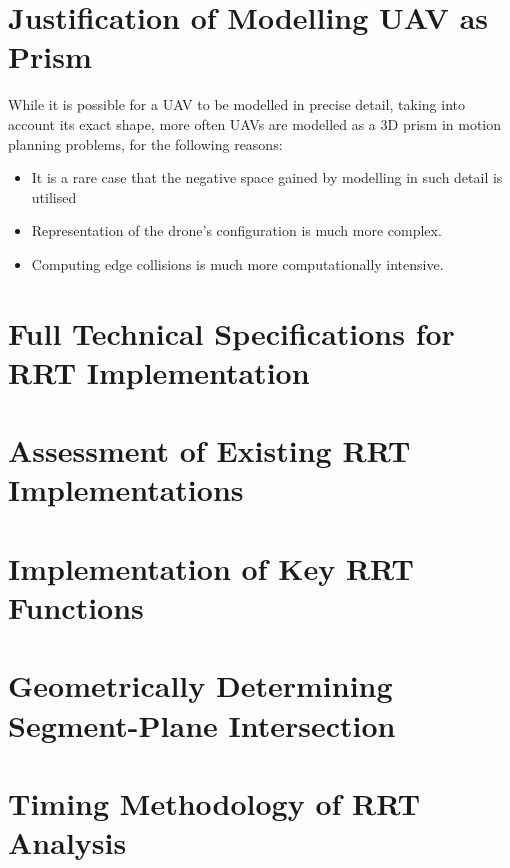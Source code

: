 
\section{Justification of Modelling UAV as Prism}
\label{section:rrt_appendix_modelling}
    While it is possible for a \gls{UAV} to be modelled in precise detail, taking into account its exact shape, more often \glspl{UAV} are modelled as a 3D prism in motion planning problems, for the following reasons:
    \begin{itemize}
    \item It is a rare case that the negative space gained by modelling in such detail is utilised
    \item Representation of the drone's configuration is much more complex.
    \item Computing edge collisions is much more computationally intensive.
    \end{itemize}

    

\section{Full Technical Specifications for RRT Implementation}
\label{section:rrt_appendix_tech_specs}
    

\section{Assessment of Existing RRT Implementations}
\label{section:rrt_appendix_existing_implementations}
    

\section{Implementation of Key RRT Functions}
\label{section:rrt_appendix_function_impl}
    

\newpage
\section{Geometrically Determining Segment-Plane Intersection}
\label{section:rrt_appendix_line_plane_intersection}
    

\section{Timing Methodology of RRT Analysis}
\label{section:rrt_appendix_timing}
    
